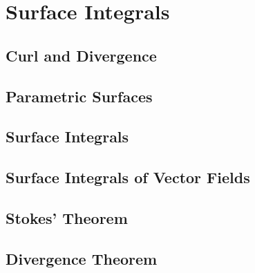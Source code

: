 \documentclass[../satmath.tex]{subfiles}
\begin{document}
\chapter{Surface Integrals}
\section{Curl and Divergence}
\section{Parametric Surfaces}
\section{Surface Integrals}
\section{Surface Integrals of Vector Fields}
\section{Stokes' Theorem}
\section{Divergence Theorem}
\end{document}
